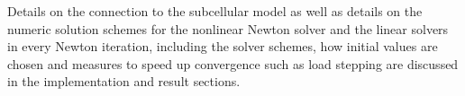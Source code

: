 Details on the connection to the subcellular model as well as details on the numeric solution schemes for the nonlinear Newton solver and the linear solvers in every Newton iteration, including the solver schemes, how initial values are chosen and measures to speed up convergence such as load stepping are discussed in the implementation and result sections.



